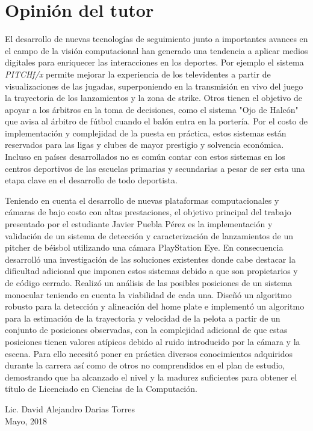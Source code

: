 \chapter*{Opinión del tutor}\label{chapter:supervisorOpinion}

El desarrollo de nuevas tecnologías de seguimiento junto a importantes avances en el campo de la visión computacional han generado una tendencia a aplicar medios digitales para enriquecer las interacciones en los deportes. Por ejemplo el sistema \textit{PITCHf/x} permite mejorar la experiencia de los televidentes a partir de visualizaciones de las jugadas, superponiendo en la transmisión en vivo del juego la trayectoria de los lanzamientos y la zona de strike. Otros tienen el objetivo de apoyar a los árbitros en la toma de decisiones, como el sistema "Ojo de Halcón" que avisa al árbitro de fútbol cuando el balón entra en la portería. Por el costo de implementación y complejidad de la puesta en práctica, estos sistemas están reservados para las ligas y clubes de mayor prestigio y solvencia económica. Incluso en países desarrollados no es común contar con estos sistemas en los centros deportivos de las escuelas primarias y secundarias a pesar de ser esta una etapa clave en el desarrollo de todo deportista.

Teniendo en cuenta el desarrollo de nuevas plataformas computacionales y cámaras de bajo costo con altas prestaciones, el objetivo principal del trabajo presentado por el estudiante Javier Puebla Pérez es la implementación y validación de un sistema de detección y caracterización de lanzamientos de un pitcher de béisbol utilizando una cámara PlayStation Eye. En consecuencia desarrolló una investigación de las soluciones existentes donde cabe destacar la dificultad adicional que imponen estos sistemas debido a que son propietarios y de código cerrado. Realizó un análisis de las posibles posiciones de un sistema monocular teniendo en cuenta la viabilidad de cada una. Diseñó un algoritmo robusto para la detección y alineación del home plate e implementó un algoritmo para la estimación de la trayectoria y velocidad de la pelota a partir de un conjunto de posiciones observadas, con la complejidad adicional de que estas posiciones tienen valores atípicos debido al ruido introducido por la cámara y la escena. Para ello necesitó poner en práctica diversos conocimientos adquiridos durante la carrera así como de otros no comprendidos en el plan de estudio, demostrando que ha alcanzado el nivel y la madurez suficientes para obtener el título de Licenciado en Ciencias de la Computación.

\begin{flushright}
	Lic. David Alejandro Darias Torres\\
	Mayo, 2018
\end{flushright}
